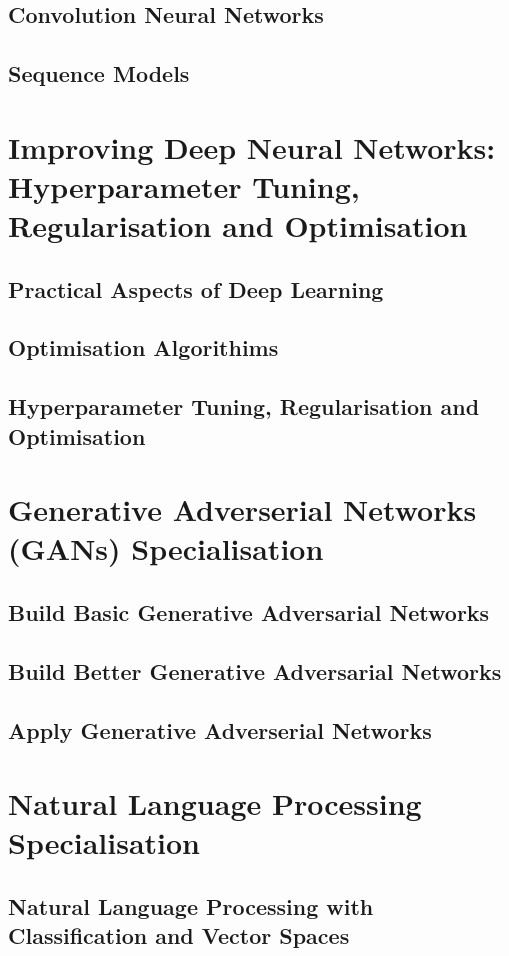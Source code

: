 \documentclass[a4paper, 11pt]{book}
\begin{document}
    \chapter{Convolution Neural Networks}
    \chapter{Sequence Models}
    
    \part{Improving Deep Neural Networks: Hyperparameter Tuning, Regularisation and Optimisation}
    \chapter{Practical Aspects of Deep Learning}
    \chapter{Optimisation Algorithims}
    \chapter{Hyperparameter Tuning, Regularisation and Optimisation}

    \part{Generative Adverserial Networks (GANs) Specialisation}
    \chapter{Build Basic Generative Adversarial Networks}
    \chapter{Build Better Generative Adversarial Networks}
    \chapter{Apply Generative Adverserial Networks}
    
    \part{Natural Language Processing Specialisation}
    \chapter{Natural Language Processing with Classification and Vector Spaces}
\end{document}
